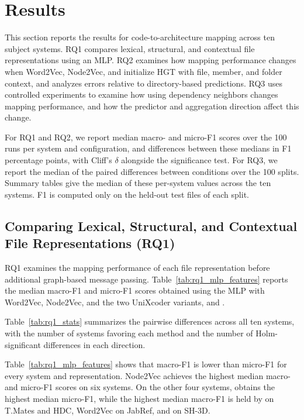 \section{Results\label{sec:results}}
This section reports the results for code-to-architecture mapping across ten subject systems. RQ1 compares lexical, structural, and contextual file representations using an MLP. RQ2 examines how mapping performance changes when Word2Vec, Node2Vec, and \ft{} initialize HGT with file, member, and folder context, and analyzes errors relative to directory-based predictions. RQ3 uses controlled experiments to examine how using dependency neighbors changes mapping performance, and how the predictor and aggregation direction affect this change.

For RQ1 and RQ2, we report median macro- and micro-F1 scores over the 100 runs per system and configuration, and differences between these medians in F1 percentage points, with Cliff's $\delta$ alongside the significance test. For RQ3, we report the median of the paired differences between conditions over the 100 splits. Summary tables give the median of these per-system values across the ten systems. F1 is computed only on the held-out test files of each split.
\subsection{Comparing Lexical, Structural, and Contextual File Representations (RQ1)\label{sec:rq1}}

RQ1 examines the mapping performance of each file representation before additional graph-based message passing. Table~\ref{tab:rq1_mlp_features} reports the median macro-F1 and micro-F1 scores obtained using the MLP with Word2Vec, Node2Vec, and the two UniXcoder variants, \zs{} and \ft{}.

Table~\ref {tab:rq1_stats} summarizes the pairwise differences across all ten systems, with the number of systems favoring each method and the number of Holm-significant differences in each direction.




Table~\ref{tab:rq1_mlp_features} shows that macro-F1 is lower than micro-F1 for every system and representation. Node2Vec achieves the highest median macro- and micro-F1 scores on six systems. On the other four systems, \ft{} obtains the highest median micro-F1, while the highest median macro-F1 is held by \ft{} on T.Mates and HDC, Word2Vec on JabRef, and \zs{} on SH-3D.

